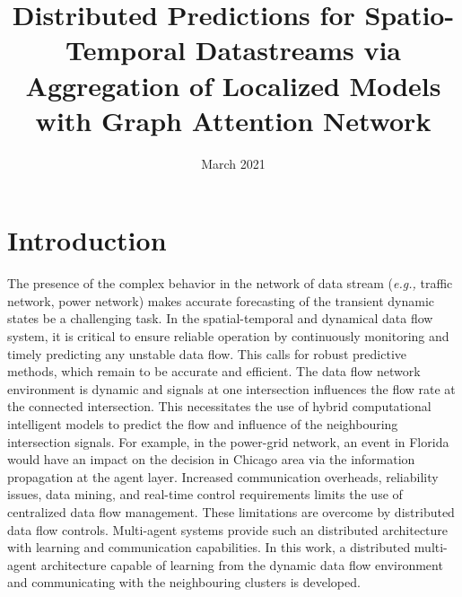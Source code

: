 \documentclass{article}
\title{Distributed Predictions for Spatio-Temporal Datastreams via Aggregation of Localized Models with Graph Attention Network}
\date{March 2021}
\begin{document}
\maketitle

\section{Introduction}

The presence of the complex behavior in the network of data stream (\emph{e.g.,} traffic network, power network) makes accurate forecasting of the transient dynamic states be a challenging task. In the spatial-temporal and dynamical data flow system, it is critical to ensure reliable operation by continuously monitoring and timely predicting any unstable data flow. This calls for robust predictive methods, which remain to be accurate and efficient. The data flow network environment is dynamic and  signals at one intersection
influences the flow rate at the connected intersection. This necessitates the use
of hybrid computational intelligent models to predict the flow and influence of
the neighbouring intersection signals. For example, in the power-grid network, an event in Florida would have an impact on the decision in Chicago area via the information propagation at the agent layer. Increased communication overheads, reliability issues, data mining, and real-time control requirements limits the use of centralized data flow management. These limitations are overcome by distributed data flow controls. Multi-agent systems provide such an distributed architecture with learning and communication capabilities. In this work, a distributed multi-agent architecture capable of learning from the dynamic data flow environment and communicating with the neighbouring clusters is developed.
\end{document}

